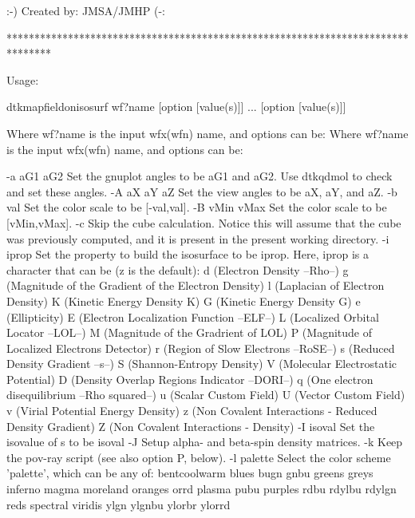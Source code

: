                          :-) Created by: JMSA/JMHP (-:

********************************************************************************


Usage:

	dtkmapfieldonisosurf wf?name [option [value(s)]] ... [option [value(s)]]

Where wf?name is the input wfx(wfn) name, and options can be:
Where wf?name is the input wfx(wfn) name, and options can be:

  -a aG1 aG2	Set the gnuplot angles to be aG1 and aG2.
            	  Use dtkqdmol to check and set these angles.
  -A aX aY aZ	Set the view angles to be aX, aY, and aZ.
  -b val    	Set the color scale to be [-val,val].
  -B vMin vMax	Set the color scale to be [vMin,vMax].
  -c        	Skip the cube calculation. Notice this will assume that the
            	  cube was previously computed, and it is present in the
            	  present working directory.
  -i iprop   	Set the property to build the isosurface to be iprop.
            	  Here, iprop is a character that can be (z is the default):
         		d (Electron Density --Rho--)
         		g (Magnitude of the Gradient of the Electron Density)
         		l (Laplacian of Electron Density)
         		K (Kinetic Energy Density K)
         		G (Kinetic Energy Density G)
         		e (Ellipticity)
         		E (Electron Localization Function --ELF--)
         		L (Localized Orbital Locator --LOL--)
         		M (Magnitude of the Gradrient of LOL)
         		P (Magnitude of Localized Electrons Detector)
         		r (Region of Slow Electrons --RoSE--)
         		s (Reduced Density Gradient --s--)
         		S (Shannon-Entropy Density)
         		V (Molecular Electrostatic Potential)
         		D (Density Overlap Regions Indicator --DORI--)
         		q (One electron disequilibrium --Rho squared--)
         		u (Scalar Custom Field)
         		U (Vector Custom Field)
         		v (Virial Potential Energy Density)
         		z (Non Covalent Interactions - Reduced Density Gradient)
         		Z (Non Covalent Interactions - Density)
  -I isoval 	Set the isovalue of s to be isoval
  -J        	Setup alpha- and beta-spin density matrices.
  -k        	Keep the pov-ray script (see also option P, below).
  -l palette	Select the color scheme 'palette', which can be any of:
            	  bentcoolwarm blues bugn gnbu greens greys inferno
            	  magma moreland oranges orrd plasma pubu purples rdbu
            	  rdylbu rdylgn reds spectral viridis ylgn ylgnbu
            	  ylorbr ylorrd
